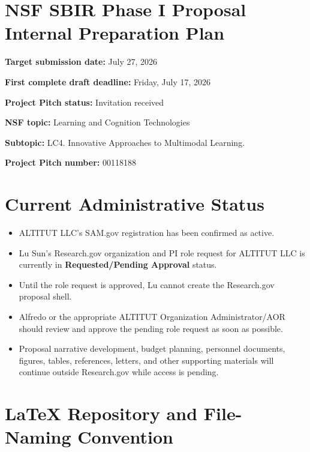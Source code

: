 \documentclass[11pt,letterpaper]{article}
\begin{document}
\section*{NSF SBIR Phase I Proposal Internal Preparation Plan}

\textbf{Target submission date:} July 27, 2026

\textbf{First complete draft deadline:} Friday, July 17, 2026

\textbf{Project Pitch status:} Invitation received

\textbf{NSF topic:} Learning and Cognition Technologies

\textbf{Subtopic:}  LC4. Innovative Approaches to Multimodal Learning.

\textbf{Project Pitch number:} 00118188

\section{Current Administrative Status}

\begin{itemize}[leftmargin=0.25in]
    \item ALTITUT LLC's SAM.gov registration has been confirmed as active.
    
    \item Lu Sun's Research.gov organization and PI role request for ALTITUT
    LLC is currently in \textbf{Requested/Pending Approval} status.
    
    \item Until the role request is approved, Lu cannot create the
    Research.gov proposal shell.
    
    \item Alfredo or the appropriate ALTITUT Organization Administrator/AOR
    should review and approve the pending role request as soon as possible.
    
    \item Proposal narrative development, budget planning, personnel
    documents, figures, tables, references, letters, and other supporting
    materials will continue outside Research.gov while access is pending.
\end{itemize}

\section{LaTeX Repository and File-Naming Convention}
\end{document}
